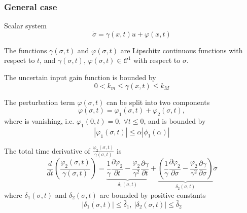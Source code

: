 \subsubsection{General case}
Scalar system
\begin{equation}
    \dot{\sigma} = \gamma(x, t)u + \varphi(x, t)
    \label{eq:castillo-general-case}
\end{equation}
\begin{assumption}
    The functions $\gamma(\sigma, t)$ and $\varphi(\sigma, t)$ are Lipschitz continuous functions with respect to $t$, and $\gamma(\sigma, t)$, $\varphi(\sigma, t) \in \mathcal{C}^1$ with respect to $\sigma$.
\end{assumption}
\begin{assumption}
    The uncertain input gain function is bounded by
            \begin{equation}
               0 < k_m \leq \gamma(x, t) \leq k_M
               \label{eq:castillo-7}
            \end{equation}
\end{assumption}
\begin{assumption}
    The perturbation term $\varphi(\sigma, t)$ can be split into two components
         \begin{equation}
            \varphi(\sigma, t) = \varphi_1(\sigma, t) + \varphi_2(\sigma, t),
         \end{equation}
         where is vanishing, i.e. $\varphi_1(0, t) = 0, \ \forall t \leq 0$, and is bounded by
            \begin{equation}
               |\varphi_1(\sigma, t)| \leq \alpha|\phi_1(\alpha)|
            \end{equation}
\end{assumption}
\begin{assumption}
    The total time derivative of $\frac{\varphi_2(\sigma, t)}{\gamma(\sigma, t)}$ is 
            \begin{equation}
               \frac{d}{dt}\left(\frac{\varphi_2(\sigma, t)}{\gamma(\sigma, t)}\right) = 
               \underbrace{\frac{1}{\gamma}\frac{\partial \varphi_2}{\partial t} - \frac{\varphi_2}{\gamma^2}\frac{\partial \gamma}{\partial t}}_{\delta_1(\sigma, t)} + 
               \underbrace{\left(\frac{1}{\gamma}\frac{\partial \varphi_2}{\partial \sigma} - \frac{\varphi_2}{\gamma^2}\frac{\partial \gamma}{\partial \sigma}\right)}_{\delta_2(\sigma, t)}\dot{\sigma}
            \end{equation}
            where $\delta_1(\sigma, t)$ and $\delta_2(\sigma, t)$ are bounded by positive constants
            \begin{equation}
               |\delta_1(\sigma, t)| \leq \bar{\delta}_1, \ |\delta_2(\sigma, t)| \leq \bar{\delta}_2
            \label{eq:castillo-13}
            \end{equation}
\end{assumption}


